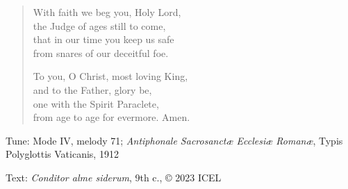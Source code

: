 \hymn



\setlength{\vleftmargin}{2em}
\begin{verse}
With faith we beg you, Holy Lord,\\
the Judge of ages still to come,\\
that in our time you keep us safe\\
from snares of our deceitful foe.

To you, O Christ, most loving King,\\
and to the Father, glory be,\\
one with the Spirit Paraclete,\\
from age to age for evermore. Amen.
\end{verse}

\setlength{\vleftmargin}{\defleftmargini}


\begin{hymnsource}
Tune: Mode IV, melody 71; \emph{Antiphonale Sacrosanctæ Ecclesiæ Romanæ}, Typis Polyglottis Vaticanis, 1912

Text: \emph{Conditor alme siderum}, 9th c., © 2023 ICEL

\end{hymnsource}
